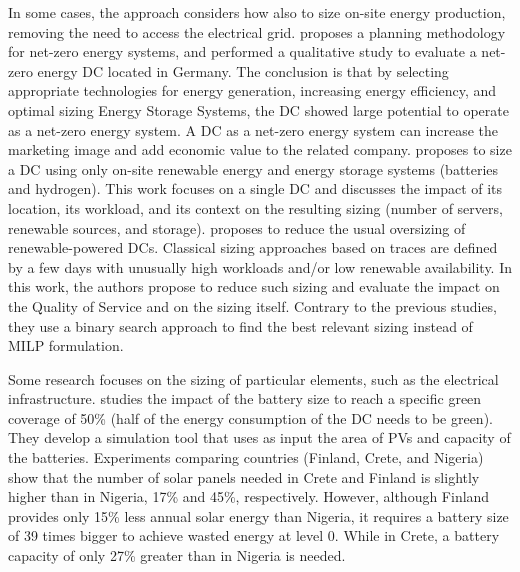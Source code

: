 In some cases, the approach considers how also to size on-site energy production, removing the need to access the electrical grid.
\citet{Richter2021_netzero_dcs} proposes a planning methodology for net-zero energy systems, and performed a qualitative study to evaluate a net-zero energy DC located in Germany. The conclusion is that by selecting appropriate technologies for energy generation, increasing energy efficiency, and optimal sizing Energy Storage Systems, the DC showed large potential to operate as a net-zero energy system. A DC as a net-zero energy system can increase the marketing image and add economic value to the related company.
%
\citet{HADDAD2021100505} proposes to size a DC using only on-site renewable energy and energy storage systems (batteries and hydrogen). This work focuses on a single DC and discusses the impact of its location, its workload, and its context on the resulting sizing (number of servers, renewable sources, and storage).
%
\citet{manal2022} proposes to reduce the usual oversizing of renewable-powered DCs. Classical sizing approaches based on traces are defined by a few days with unusually high workloads and/or low renewable availability. In this work, the authors propose to reduce such sizing and evaluate the impact on the Quality of Service and on the sizing itself. Contrary to the previous studies, they use a binary search approach to find the best relevant sizing instead of MILP formulation.

Some research focuses on the sizing of particular elements, such as the electrical infrastructure.
%
\citet{sheme2018_batsize} studies the impact of the battery size to reach a specific green coverage of 50\% (half of the energy consumption of the DC needs to be green). They develop a simulation tool that uses as input the area of PVs and capacity of the batteries. Experiments comparing countries (Finland, Crete, and Nigeria) show that the number of solar panels needed in Crete and Finland is slightly higher than in Nigeria, 17\% and 45\%, respectively. However, although Finland provides only 15\% less annual solar energy than Nigeria, it requires a battery size of 39 times bigger to achieve wasted energy at level 0. While in Crete, a battery capacity of only 27\% greater than in Nigeria is needed. %


